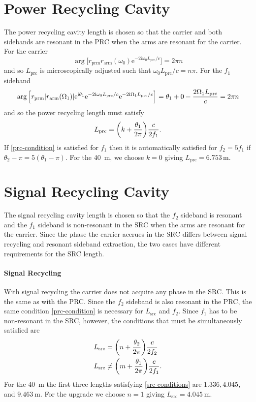 \documentclass[12pt]{article}
\newcommand{\mr}[1]{\mathrm{#1}}
\newcommand{\e}{\mr{e}}
\renewcommand{\i}{\mr{i}}
\newcommand{\abs}[1]{\left|#1\right|}
\let\originalleft\left
\let\originalright\right
\renewcommand{\left}{\mathopen{}\mathclose\bgroup\originalleft}
\renewcommand{\right}{\aftergroup\egroup\originalright}
\begin{document}
\section{Power Recycling Cavity}

The power recycling cavity length is chosen so that the carrier and both sidebands are resonant in the PRC when the arms are resonant for the carrier. For the carrier
\begin{equation}
\arg \Big[ r_\mr{prm} r_\mr{arm}(\omega_0) \e^{-2\i\omega_0 L_\mr{prc}/c} \Big] = 2\pi n
\end{equation}
and so $L_\mr{prc}$ is microscopically adjusted such that $\omega_0 L_\mr{prc} / c = n\pi$. For the $f_1$ sideband
\begin{equation}
\arg \Big[r_\mr{prm} \abs{r_\mr{arm}(\Omega_1)}\e^{\i\theta_1} \e^{-2\i\omega_0 L_\mr{prc}/c}
\e^{-2\i\Omega_1 L_\mr{prc}/c} \Big]
= \theta_1 + 0 - \frac{2\Omega_1 L_\mr{prc}}{c}
= 2\pi n
\end{equation}
and so the power recycling length must satisfy
\begin{equation}
L_\mr{prc} = \left(k + \frac{\theta_1}{2\pi} \right) \frac{c}{2f_1}.
\label{prc-condition}
\end{equation}
If \eqref{prc-condition} is satisfied for $f_1$ then it is automatically satisfied for $f_2 = 5f_1$ if $\theta_2 - \pi = 5(\theta_1 - \pi)$. For the 40~m, we choose $k=0$ giving $L_\mr{prc} = 6.753\,\mr{m}$.


\section{Signal Recycling Cavity}

The signal recycling cavity length is chosen so that the $f_2$ sideband is resonant and the $f_1$ sideband is non-resonant in the SRC when the arms are resonant for the carrier. Since the phase the carrier accrues in the SRC differs between signal recycling and resonant sideband extraction, the two cases have different requirements for the SRC length.

\paragraph{Signal Recycling} With signal recycling the carrier does not acquire any phase in the SRC. This is the same as with the PRC. Since the $f_2$ sideband is also resonant in the PRC, the same condition \eqref{prc-condition} is necessary for $L_\mr{src}$ and $f_2$. Since $f_1$ has to be non-resonant in the SRC, however, the conditions that must be simultaneously satisfied are
\begin{subequations}
\label{src-conditions}
\begin{align}
L_\mr{src} &= \left( n + \frac{\theta_2}{2\pi}\right) \frac{c}{2f_2}\\
L_\mr{src} &\neq \left( m + \frac{\theta_1}{2\pi}\right) \frac{c}{2f_1}.
\end{align}
\end{subequations}
For the 40~m the first three lengths satisfying \eqref{src-conditions} are $1.336, 4.045,$ and $9.463~\mr{m}$. For the upgrade we choose $n=1$ giving $L_\mr{src} = 4.045~\mr{m}$.
\end{document}
